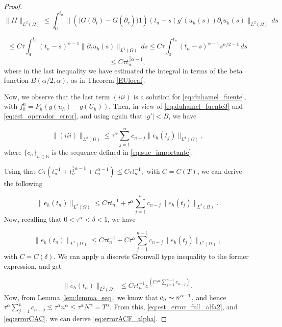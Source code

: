 \documentclass{amsart}
\newcommand{\ele}{L^2(\Omega)}
\newcommand{\W}{\Omega}
\newcommand{\fmonio}{g}
\def\N{{\mathbb {N}}}
\theoremstyle{remark}
\theoremstyle{definition}
\numberwithin{equation}{section}
\begin{document}
\begin{proof}
$$
\|II\|_{\ele} \leq \int^{t_n}_{0} \|(\big(G(\partial_t) - G(\overline{\partial_{\tau}}) \big)1)(t_n - s)\fmonio'(u_h(s))\partial_t u_h(s)\|_{\ele} \, ds
$$

$$ \leq  C\tau\int^{t_n}_0 (t_n - s)^{\alpha-1}  \|\partial_t u_h(s)\|_{L^2(\Omega)} \,ds \leq C\tau\int^{t_n}_0 (t_n - s)^{\alpha-1} s^{\alpha/2 -1} \,ds
$$
$$
\leq C \tau t_n^{\frac{3}{2}\alpha -1},
$$
where in the last inequality we have estimated the integral in terms of the beta function $B(\alpha/2,\alpha)$, as in Theorem \ref{EUlocal}.    



Now, we observe that the last term $(iii)$ is a solution for \eqref{eq:duhamel_fuente}, with $f^n_h = P_h(\fmonio(u_h)-\fmonio(U_h))$. Then, in view of \eqref{eq:duhamel_fuente3} and \eqref{eq:est_operador_error}, and using again that $|\fmonio'|<B$, we have 

$$\|(iii)\|_{L^2(\W)} \leq \tau^{\alpha}\sum^{n}_{j=1} c_{n - j} \|e_h(t_j)\|_{L^2(\W)}, $$
where $\{c_n\}_{n \in \N}$ is the sequence defined in \eqref{eq:suc_importante}.

Using that $C\tau(  t_n^{-1} + t_n^{\frac{3}{2}\alpha -1} +  t_n^{\alpha -1} ) \leq C\tau t_n^{-1},$
with $C = C(T)$, we can derive the following  

\begin{equation*}
\label{eq:est_error_full_alfa}
\|e_h(t_n)\|_{L^2(\W)} \leq C \tau t_n^{-1} + \tau^{\alpha}\sum^{n}_{j=1} c_{n - j} \|e_h(t_j)\|_{L^2(\W)}.
\end{equation*} 
Now, recalling that $0<\tau^{\alpha}<\delta<1$, we have

\begin{equation*}
\label{eq:est_error_full_alfa1}
\|e_h(t_n)\|_{L^2(\W)} \leq C \tau t_n^{-1} + C\tau^{\alpha}\sum^{n-1}_{j=1} c_{n - j} \|e_h(t_j)\|_{L^2(\W)},
\end{equation*} 
with $C = C(\delta)$. We can apply a discrete Gronwall type inequality to the former expression, and get

\begin{equation}
\label{eq:est_error_full_alfa2}
\|e_h(t_n)\|_{L^2(\W)} \leq C \tau t_n^{-1}e^{ (C\tau^{\alpha}\sum^{n-1}_{j=1} c_{n - j}) }.
\end{equation} 
Now, from Lemma \ref{lem:lemma_seq}, we know that $c_n \thicksim n^{\alpha - 1}$, and hence $\tau^{\alpha}\sum^{n}_{j=1} c_{n - j} \lesssim \tau^{\alpha}n^{\alpha} \leq \tau^{\alpha}N^{\alpha} = T^{\alpha}$. From this, \eqref{eq:est_error_full_alfa2}, and \eqref{eq:errorCAC}, we can derive \eqref{eq:errorACF_alpha}.    \end{proof}
   
\end{document}
